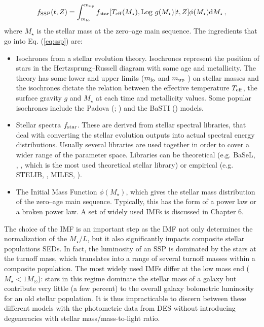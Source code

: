 \begin{equation}
f_{\rm SSP} (t,Z) = \int^{m_{\rm up}}_{m_{\rm lo}} f_{\rm star}[T_{\rm eff} (M_\star), {\rm Log} ~g(M_\star)|t,Z] \phi(M_\star) {\rm d} M_\star\, , \label{eq:ssp}
\end{equation}
where $M_\star$ is the stellar mass at the zero--age main sequence.
The ingredients that go into Eq. (\ref{eq:ssp}) are:
\begin{itemize}
\item Isochrones from a stellar evolution theory. Isochrones represent the position of stars in the Hertzsprung--Russell diagram with same age and metallicity. The theory has some lower and upper limits ($m_{\rm lo}$ and $m_{\rm up}$ ) on stellar masses and the isochrones dictate the relation between the effective temperature $T_{\rm eff}$, the surface gravity $g$ and $M_\star$ at each time and metallicity values. Some popular isochrones include the Padova (\citealt{bertelli}; \citealt{girardi}) and the BaSTI (\citealt{pietrinferni}) models.
\item Stellar spectra $f_{\rm star}$. These are derived from stellar spectral libraries, that deal with converting the stellar evolution outputs into actual spectral energy distributions. Usually several libraries are used together in order to cover a wider range of the parameter space. Libraries can be theoretical (e.g. BaSeL, \citealt{basel1}, \citealt{basel2}, \citealt{basel3} which is the most used theoretical stellar library) or empirical (e.g. STELIB, \citealt{stelib}, MILES, \citealt{miles}).
\item The Initial Mass Function $\phi(M_\star)$, which gives the stellar mass distribution of the zero--age main sequence. Typically, this has the form of a power law or a broken power law. A set of widely used IMFs is discussed in Chapter 6.
\end{itemize}
The choice of the IMF is an important step as the IMF not only determines the normalization of the $M_\star/L$, but it also significantly impacts composite stellar populations SEDs. In fact, the luminosity of an SSP is dominated by the stars at the turnoff mass, which translates into a range of several turnoff masses within a composite population. The most widely used IMFs differ at the low mass end ($M_\star <1 M_\odot$): stars in this regime dominate the stellar mass of a galaxy but contribute very little (a few percent) to the overall galaxy bolometric luminosity for an old stellar population. It is thus impracticable to discern between these different models with the photometric data from DES without introducing degeneracies with stellar mass/mass-to-light ratio.

